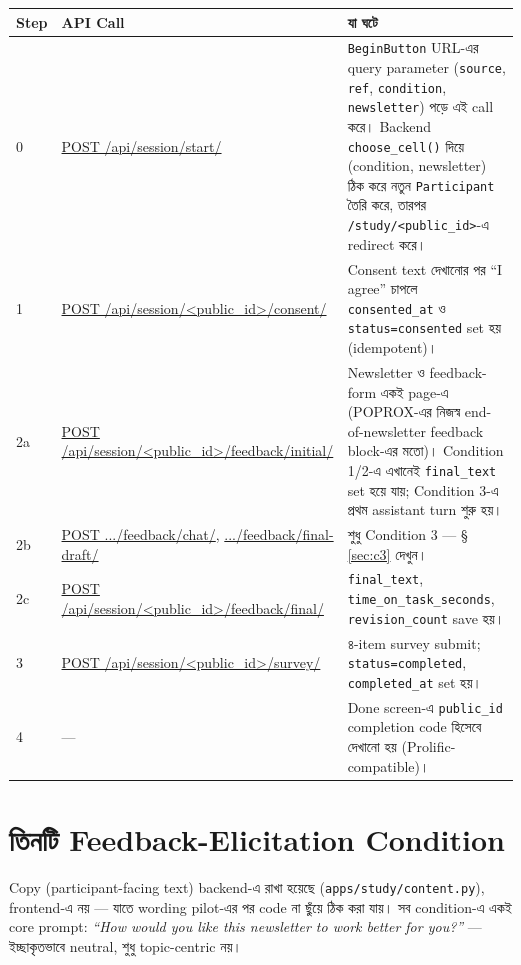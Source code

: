 \documentclass[11pt,a4paper]{article}
\newcommand{\code}[1]{\texttt{\small #1}}
\newcommand{\file}[1]{\texttt{\small #1}}
\begin{document}
\begin{longtable}{@{}p{1.0cm}p{4.6cm}p{9.8cm}@{}}
\toprule
\textbf{Step} & \textbf{API Call} & \textbf{যা ঘটে} \\
\midrule
\endhead
0 & \url{POST /api/session/start/} & \code{BeginButton} URL-এর query parameter (\code{source},
  \code{ref}, \code{condition}, \code{newsletter}) পড়ে এই call করে। Backend
  \code{choose\_cell()} দিয়ে (condition, newsletter) ঠিক করে নতুন \code{Participant} তৈরি
  করে, তারপর \code{/study/<public\_id>}-এ redirect করে। \\
1 & \url{POST /api/session/<public_id>/consent/} & Consent text দেখানোর পর ``I agree'' চাপলে
  \code{consented\_at} ও \code{status=consented} set হয় (idempotent)। \\
2a & \url{POST /api/session/<public_id>/feedback/initial/} & Newsletter ও feedback-form একই
  page-এ (POPROX-এর নিজস্ব end-of-newsletter feedback block-এর মতো)। Condition 1/2-এ এখানেই
  \code{final\_text} set হয়ে যায়; Condition 3-এ প্রথম assistant turn শুরু হয়। \\
2b & \url{POST .../feedback/chat/}, \url{.../feedback/final-draft/} & শুধু Condition 3 ---
  \S\,\ref{sec:c3} দেখুন। \\
2c & \url{POST /api/session/<public_id>/feedback/final/} & \code{final\_text},
  \code{time\_on\_task\_seconds}, \code{revision\_count} save হয়। \\
3 & \url{POST /api/session/<public_id>/survey/} & ৪-item survey submit; \code{status=completed},
  \code{completed\_at} set হয়। \\
4 & --- & Done screen-এ \code{public\_id} completion code হিসেবে দেখানো হয় (Prolific-compatible)। \\
\bottomrule
\end{longtable}

\newpage
\section{তিনটি Feedback-Elicitation Condition}

Copy (participant-facing text) backend-এ রাখা হয়েছে (\file{apps/study/content.py}),
frontend-এ নয় --- যাতে wording pilot-এর পর code না ছুঁয়ে ঠিক করা যায়। সব condition-এ একই
core prompt: \textit{``How would you like this newsletter to work better for you?''} ---
ইচ্ছাকৃতভাবে neutral, শুধু topic-centric নয়।
\end{document}
